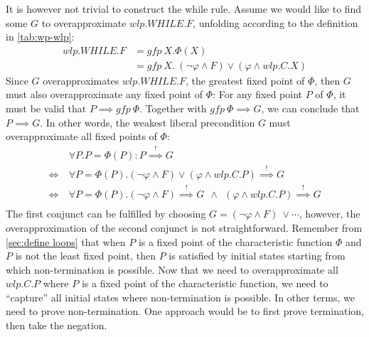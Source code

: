It is however not trivial to construct the while rule. 
Assume we would like to find some $G$ to overapproximate $wlp.WHILE.F$, unfolding according to the definition in \autoref{tab:wp-wlp}: 
\begin{align*}
	wlp.WHILE.F &= gfp\ X. \Phi(X)\\  
	&= gfp\ X.\ (\neg\varphi\wedge F)\vee(\varphi\wedge wlp.C.X) 
\end{align*}
Since $G$ overapproximates $wlp.WHILE.F$, the greatest fixed point of $\Phi$, then $G$ must also overapproximate any fixed point of $\Phi$: 
For any fixed point $P$ of $\Phi$, it must be valid that $P\implies gfp\ \Phi$. 
Together with $gfp\ \Phi\implies G$, we can conclude that $P\implies G$. 
In other words, the weakest liberal precondition $G$ must overapproximate all fixed points of $\Phi$: 
\renewcommand{\iff}{\Leftrightarrow}
\begin{align*}
	&\forall P. P=\Phi(P): P\overset{!}{\implies} G\\  
	\iff \ &\forall P=\Phi(P). (\neg\varphi\wedge F)\vee(\varphi\wedge wlp.C.P)\overset{!}{\implies} G\\  
	\iff \ &\forall P=\Phi(P). (\neg\varphi\wedge F) \overset{!}{\implies} G 
	\ \ \wedge\ \ 
	(\varphi\wedge wlp.C.P)\overset{!}{\implies} G\\  
\end{align*}
The first conjunct can be fulfilled by choosing $G=(\neg\varphi\wedge F)\ \vee\cdots$, however, the overapproximation of the second conjunct is not straightforward. 
Remember from \autoref{sec:define loops} that when $P$ is a fixed point of the characteristic function $\Phi$ and $P$ is not the least fixed point, then $P$ is satisfied by initial states starting from which non-termination is possible. 
Now that we need to overapproximate all $wlp.C.P$ where $P$ is a fixed point of the characteristic function, we need to ``capture'' all initial states where non-termination is possible. 
In other terms, we need to prove non-termination. 
One approach would be to first prove termination, then take the negation. 

